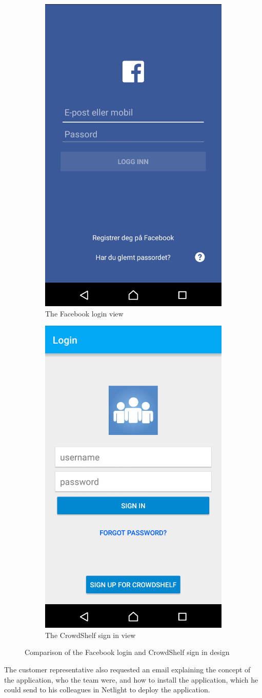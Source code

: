 \begin{figure}
\centering
\begin{subfigure}{.5\textwidth}
  \centering
  \includegraphics[width=.4\textwidth]{figs/v06/facebook-login-view-6.png}
  \caption{The Facebook login view}
  \label{fig:facebook-login-view-6}
\end{subfigure}%
\begin{subfigure}{.5\textwidth}
  \centering
  \includegraphics[width=.4\textwidth]{figs/v06/crowdshelf-login-view-6.png}
  \caption{The CrowdShelf sign in view}
  \label{fig:crowdshelf-login-view-6}
\end{subfigure}
\caption{Comparison of the Facebook login and CrowdShelf sign in design}
\label{fig:login-view-comparison-6}
\end{figure}


The customer representative also requested an email explaining the concept of the application, who the team were, and how to install the application, which he could send to his colleagues in Netlight to deploy the application.


